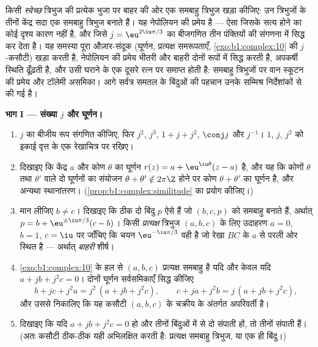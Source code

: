 \begin{problem}\label{pb:b1:complex:1}
किसी \emph{स्वेच्छ} त्रिभुज की प्रत्येक भुजा पर बाहर की ओर एक समबाहु त्रिभुज
खड़ा कीजिए: उन त्रिभुजों के तीनों केंद्र सदा एक समबाहु त्रिभुज बनाते हैं। यह
नेपोलियन की प्रमेय है --- ऐसा  जिसके सत्य होने
का कोई दृश्य कारण नहीं है, और जिसे $j = \eu^{2\iu\pi/3}$ का बीजगणित तीन
पंक्तियों की संगणना में सिद्ध कर देता है। यह समस्या पूरा औज़ार-संदूक
(घूर्णन, प्रत्यक्ष समरूपताएँ, \cref{exo:b1:complex:10} की $j$-कसौटी) खड़ा
करती है, नेपोलियन की प्रमेय भीतरी और बाहरी दोनों रूपों में सिद्ध करती है,
अपकर्षी स्थिति ढूँढ़ती है, और उसी घराने के एक दूसरे रत्न पर समाप्त होती है:
समबाहु त्रिभुजों पर वान स्कूटन की प्रमेय और टॉलेमी असमिका। आगे सर्वत्र समतल
के बिंदुओं की पहचान उनके सम्मिश्र निर्देशांकों से की गई है।

\medskip \noindent\textbf{भाग I --- संख्या $j$ और घूर्णन।}
\begin{enumerate}
  \item $j$ का बीजीय रूप संगणित कीजिए, फिर $j^2$, $j^3$, $1 + j + j^2$,
  $\conj j$ और $j^{-1}$। $1$, $j$, $j^2$ को इकाई वृत्त के एक रेखाचित्र पर
  रखिए।
  \item दिखाइए कि केंद्र $a$ और कोण $\theta$ का घूर्णन $r(z) = a +
  \eu^{\iu\theta}(z - a)$ है, और यह कि कोणों $\theta$ तथा $\theta'$ वाले दो
  घूर्णनों का संयोजन $\theta + \theta' \notin 2\pi\Z$ होने पर कोण $\theta +
  \theta'$ का घूर्णन है, और अन्यथा स्थानांतरण।
  (\cref{prop:b1:complex:similitude} का प्रयोग कीजिए।)
  \item मान लीजिए $b \neq c$। दिखाइए कि ठीक दो बिंदु $p$ ऐसे हैं जो $(b, c,
  p)$ को समबाहु बनाते हैं, अर्थात् $p = b + \eu^{\pm\iu\pi/3}(c - b)$। किसी
  \emph{प्रत्यक्ष} त्रिभुज $(a, b, c)$ के लिए उदाहरण $a = 0$, $b = 1$, $c =
  \iu$ पर जाँचिए कि चयन $\eu^{-\iu\pi/3}$ वही है जो रेखा $BC$ के $a$ से परली
  ओर स्थित है --- अर्थात् \emph{बाहरी} शीर्ष।
  \item \cref{exo:b1:complex:10} के हल से $(a, b, c)$ प्रत्यक्ष समबाहु है
  यदि और केवल यदि $a + jb + j^2c = 0$। दोनों घूर्णन सर्वसमिकाएँ सिद्ध कीजिए
        \[
        b + jc + j^2a = j^2\,(a + jb + j^2c),
        \qquad
        c + ja + j^2b = j\,(a + jb + j^2c),
        \]
        और उससे निकालिए कि यह कसौटी $(a, b, c)$ के चक्रीय  के अंतर्गत
        अपरिवर्ती है।
  \item दिखाइए कि यदि $a + jb + j^2c = 0$ हो और तीनों बिंदुओं में से दो
  संपाती हों, तो तीनों संपाती हैं। (अतः कसौटी ठीक-ठीक यही अभिलक्षित करती है:
  प्रत्यक्ष समबाहु त्रिभुज, या एक ही बिंदु।)
\end{enumerate}


\end{problem}
